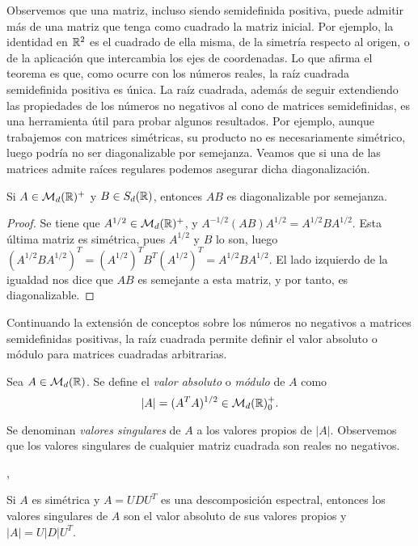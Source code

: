 Observemos que una matriz, incluso siendo semidefinida positiva, puede admitir más de una matriz que tenga como cuadrado la matriz inicial. Por ejemplo, la identidad en $\mathbb{R}^2$ es el cuadrado de ella misma, de la simetría respecto al origen, o de la aplicación que intercambia los ejes de coordenadas. Lo que afirma el teorema es que, como ocurre con los números reales, la raíz cuadrada semidefinida positiva es única. La raíz cuadrada, además de seguir extendiendo las propiedades de los números no negativos al cono de matrices semidefinidas, es una herramienta útil para probar algunos resultados. Por ejemplo, aunque trabajemos con matrices simétricas, su producto no es necesariamente simétrico, luego podría no ser diagonalizable por semejanza. Veamos que si una de las matrices admite raíces regulares podemos asegurar dicha diagonalización.

\begin{cor}
    Si $A \in \mathcal{M}_d(\mathbb{R})^+$ y $B \in S_d(\mathbb{R})$, entonces $AB$ es diagonalizable por semejanza.
\end{cor}

\begin{proof}
    Se tiene que $A^{1/2} \in \mathcal{M}_d(\mathbb{R})^+$, y $A^{-1/2}(AB)A^{1/2} = A^{1/2}BA^{1/2}$. Esta última matriz es simétrica, pues $A^{1/2}$ y $B$ lo son, luego $(A^{1/2}BA^{1/2})^T = (A^{1/2})^TB^T(A^{1/2})^T = A^{1/2}BA^{1/2}$. El lado izquierdo de la igualdad nos dice que $AB$ es semejante a esta matriz, y por tanto, es diagonalizable.
\end{proof}

Continuando la extensión de conceptos sobre los números no negativos a matrices semidefinidas positivas, la raíz cuadrada permite definir el valor absoluto o módulo para matrices cuadradas arbitrarias.

\begin{definition}
    Sea $A \in \mathcal{M}_d(\mathbb{R})$. Se define el \emph{valor absoluto} o \emph{módulo} de $A$ como
    \[ |A| = (A^TA)^{1/2} \in \mathcal{M}_d(\mathbb{R})^+_0. \]

    Se denominan \emph{valores singulares} de $A$ a los valores propios de $|A|$. Observemos que los valores singulares de cualquier matriz cuadrada son reales no negativos.
\end{definition},

\begin{remark}
    Si $A$ es simétrica y $A = UDU^T$ es una descomposición espectral, entonces los valores singulares de $A$ son el valor absoluto de sus valores propios y $|A| = U|D|U^T$.
\end{remark}

